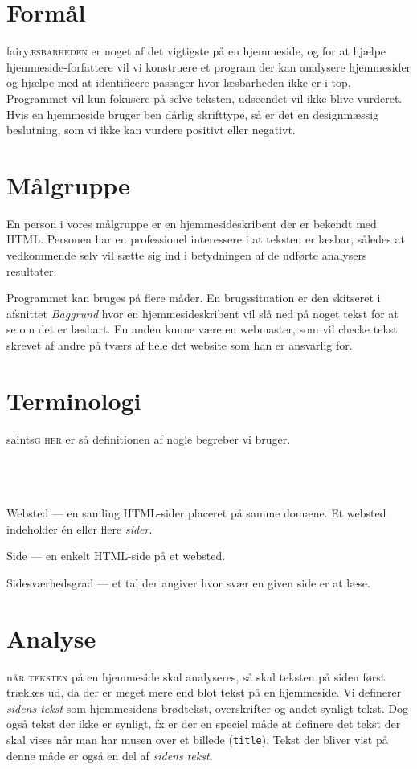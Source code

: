 \documentclass[a4paper,oneside,article, titlepage]{article}
\begin{document}
\section{Formål}
\lettrine[lines=5,findent=0.5em,loversize=0.07,nindent=0em,image=true]%
{fairy}{æsbarheden } er noget af det vigtigste på en hjemmeside, og
for at hjælpe hjemmeside-forfattere vil vi konstruere et program der
kan analysere hjemmesider og hjælpe med at identificere passager hvor
læsbarheden ikke er i top. Programmet vil kun fokusere på selve
teksten, udseendet vil ikke blive vurderet. Hvis en hjemmeside bruger
ben dårlig skrifttype, så er det en designmæssig beslutning, som vi
ikke kan vurdere positivt eller negativt.

\section{Målgruppe}
En person i vores målgruppe er en hjemmesideskribent der er bekendt
med HTML. Personen har en professionel interessere i at teksten er
læsbar, således at vedkommende selv vil sætte sig ind i betydningen af
de udførte analysers resultater.

Programmet kan bruges på flere måder. En brugssituation er den
skitseret i afsnittet \textit{Baggrund} hvor en hjemmesideskribent vil
slå ned på noget tekst for at se om det er læsbart. En anden kunne
være en webmaster, som vil checke tekst skrevet af andre på tværs af
hele det website som han er ansvarlig for.

\section{Terminologi}
\lettrine[lines=5,findent=0.5em,loversize=0.07,nindent=0em,image=true]%
{saints}{g her} er så definitionen af nogle begreber vi bruger.
\\\\\\\\
\begin{description}
\item Websted --- en samling HTML-sider placeret på samme domæne. Et
  websted indeholder én eller flere \textit{sider}.
\item Side --- en enkelt HTML-side på et websted.
\item Sidesværhedsgrad --- et tal der angiver hvor svær en given side er
  at læse.
\end{description}

\section{Analyse}
\lettrine[lines=5,findent=0.5em,loversize=0.07,nindent=0em,image=true]%
{n}{år teksten} på en hjemmeside skal analyseres, så skal teksten på
siden først trækkes ud, da der er meget mere end blot tekst på en
hjemmeside. Vi definerer \textit{sidens tekst} som hjemmesidens
brødtekst, overskrifter og andet synligt tekst. Dog også tekst
der ikke er synligt, fx er der en speciel måde at definere det tekst
der skal vises når man har musen over et billede
(\texttt{title}). Tekst der bliver vist på denne måde er også en del
af \textit{sidens tekst}.
\end{document}
